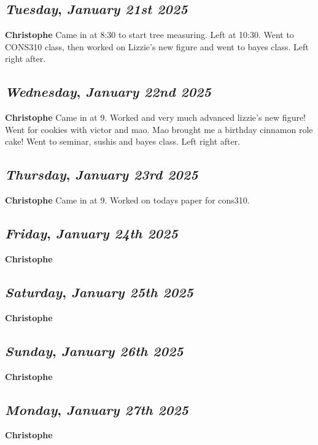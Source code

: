 \def\day{\textit{January 21st 2025}}
\def\weekday{\textit{Tuesday}}
\subsection*{\weekday, \day}
\textbf {Christophe}
Came in at 8:30 to start tree measuring. Left at 10:30. Went to CONS310 class, then worked on Lizzie's new figure and went to bayes class. Left right after.

\def\day{\textit{January 22nd 2025}}
\def\weekday{\textit{Wednesday}}
\subsection*{\weekday, \day}
\textbf {Christophe}
Came in at 9. Worked and very much advanced lizzie's new figure! Went for cookies with victor and mao. Mao brought me a birthday cinnamon role cake! Went to seminar, sushis and bayes class. Left right after.

\def\day{\textit{January 23rd 2025}}
\def\weekday{\textit{Thursday}}
\subsection*{\weekday, \day}
\textbf {Christophe}
Came in at 9. Worked on todays paper for cons310.
\def\day{\textit{January 24th 2025}}
\def\weekday{\textit{Friday}}
\subsection*{\weekday, \day}
\textbf {Christophe}

\def\day{\textit{January 25th 2025}}
\def\weekday{\textit{Saturday}}
\subsection*{\weekday, \day}
\textbf {Christophe}

\def\day{\textit{January 26th 2025}}
\def\weekday{\textit{Sunday}}
\subsection*{\weekday, \day}
\textbf {Christophe}

\def\day{\textit{January 27th 2025}}
\def\weekday{\textit{Monday}}
\subsection*{\weekday, \day}
\textbf {Christophe}

